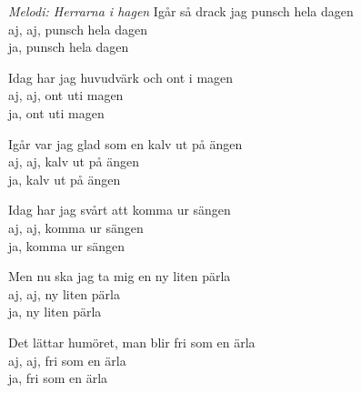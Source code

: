 {\footnotesize\textit{Melodi: Herrarna i hagen}}
\vspace{10pt}
Igår så drack jag punsch hela dagen\\
aj, aj, punsch hela dagen\\
ja, punsch hela dagen\par
\vspace{10pt}
Idag har jag huvudvärk och ont i magen\\
aj, aj, ont uti magen\\
ja, ont uti magen\par
\vspace{10pt}
Igår var jag glad som en kalv ut på ängen\\
aj, aj, kalv ut på ängen\\
ja, kalv ut på ängen\par
\vspace{10pt}
Idag har jag svårt att komma ur sängen\\
aj, aj, komma ur sängen\\
ja, komma ur sängen\par
\vspace{10pt}
Men nu ska jag ta mig en ny liten pärla\\
aj, aj, ny liten pärla\\
ja, ny liten pärla\par
\vspace{10pt}
Det lättar humöret, man blir fri som en ärla\\
aj, aj, fri som en ärla\\
ja, fri som en ärla
